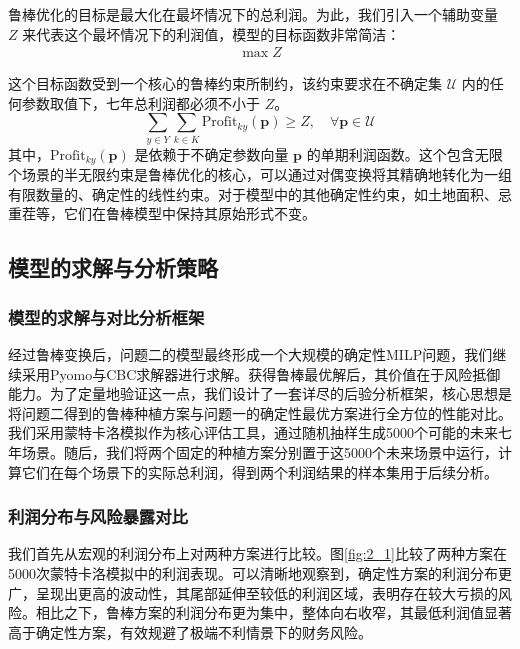 鲁棒优化的目标是最大化在最坏情况下的总利润。为此，我们引入一个辅助变量 $Z$ 来代表这个最坏情况下的利润值，模型的目标函数非常简洁：
\begin{align}
	\max Z
\end{align}

这个目标函数受到一个核心的鲁棒约束所制约，该约束要求在不确定集 $\mathcal{U}$ 内的任何参数取值下，七年总利润都必须不小于 $Z$。
\begin{equation}
	\sum_{y \in Y} \sum_{k \in K} \text{Profit}_{ky}(\mathbf{p}) \ge Z, \quad \forall \mathbf{p} \in \mathcal{U}
\end{equation}
其中，$\text{Profit}_{ky}(\mathbf{p})$ 是依赖于不确定参数向量 $\mathbf{p}$ 的单期利润函数。这个包含无限个场景的半无限约束是鲁棒优化的核心，可以通过对偶变换将其精确地转化为一组有限数量的、确定性的线性约束。对于模型中的其他确定性约束，如土地面积、忌重茬等，它们在鲁棒模型中保持其原始形式不变。

\subsection{模型的求解与分析策略}

\subsubsection{模型的求解与对比分析框架}

经过鲁棒变换后，问题二的模型最终形成一个大规模的确定性MILP问题，我们继续采用Pyomo与CBC求解器进行求解。获得鲁棒最优解后，其价值在于风险抵御能力。为了定量地验证这一点，我们设计了一套详尽的后验分析框架，核心思想是将问题二得到的鲁棒种植方案与问题一的确定性最优方案进行全方位的性能对比。我们采用蒙特卡洛模拟作为核心评估工具，通过随机抽样生成5000个可能的未来七年场景。随后，我们将两个固定的种植方案分别置于这5000个未来场景中运行，计算它们在每个场景下的实际总利润，得到两个利润结果的样本集用于后续分析。

\subsubsection{利润分布与风险暴露对比}

我们首先从宏观的利润分布上对两种方案进行比较。图\ref{fig:2_1}比较了两种方案在5000次蒙特卡洛模拟中的利润表现。可以清晰地观察到，确定性方案的利润分布更广，呈现出更高的波动性，其尾部延伸至较低的利润区域，表明存在较大亏损的风险。相比之下，鲁棒方案的利润分布更为集中，整体向右收窄，其最低利润值显著高于确定性方案，有效规避了极端不利情景下的财务风险。

